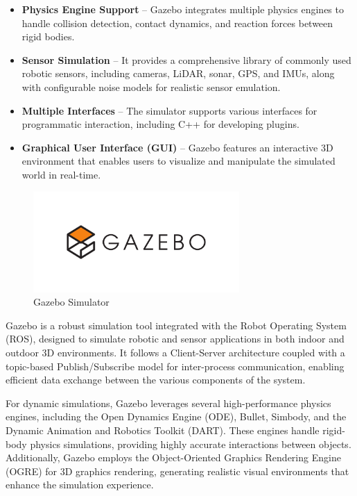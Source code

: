 \documentclass[../../main]{subfiles}
\begin{document}
\begin{itemize}
    \item \textbf{Physics Engine Support} – Gazebo integrates multiple physics engines to handle collision detection, contact dynamics, and reaction forces between rigid bodies.
    \item \textbf{Sensor Simulation} – It provides a comprehensive library of commonly used robotic sensors, including cameras, LiDAR, sonar, GPS, and IMUs, 
    along with configurable noise models for realistic sensor emulation.
    \item \textbf{Multiple Interfaces} – The simulator supports various interfaces for programmatic interaction, including C++ for developing plugins.
    \item \textbf{Graphical User Interface (GUI)} – Gazebo features an interactive 3D environment that enables users to visualize and manipulate the simulated world in real-time.
\end{itemize}

\begin{figure}[H]
    \centering
\includegraphics[width=0.7\textwidth]{fig/gazebo_logo.png}
\caption{Gazebo Simulator}
\label{Gazebo logo} %
\end{figure}
\newpage
Gazebo is a robust simulation tool integrated with the Robot Operating System (ROS),
designed to simulate robotic and sensor applications in both indoor and outdoor 3D environments. 
It follows a Client-Server architecture coupled with a topic-based Publish/Subscribe model for inter-process communication, 
enabling efficient data exchange between the various components of the system.

For dynamic simulations, Gazebo leverages several high-performance physics engines, 
including the Open Dynamics Engine (ODE)\cite{smith2016}, Bullet\cite{bullet2016}, Simbody\cite{simbody2016}, and the Dynamic Animation and Robotics Toolkit (DART)\cite{dart2016}. 
These engines handle rigid-body physics simulations, providing highly accurate interactions between objects. 
Additionally, Gazebo employs the Object-Oriented Graphics Rendering Engine (OGRE)\cite{ogre2016} for 3D graphics rendering, 
generating realistic visual environments that enhance the simulation experience.
\end{document}
